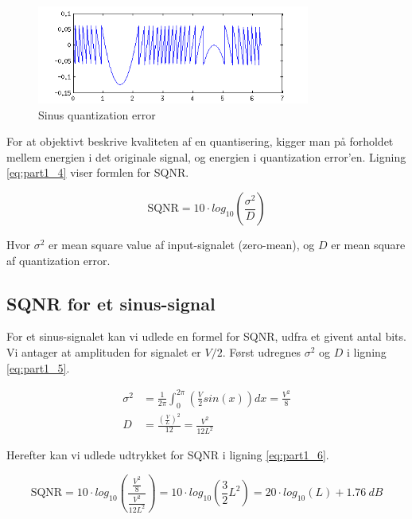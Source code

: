 \begin{figure}[!ht]
 	\centering
 	\includegraphics[width=0.8\textwidth]{resources/part1_sine_quant_error}
 	\caption{Sinus quantization error}
 	\label{fig:part1_3}
\end{figure}

For at objektivt beskrive kvaliteten af en quantisering, kigger man på forholdet mellem energien i det originale signal, og energien i quantization error'en. Ligning \ref{eq:part1_4} viser formlen for SQNR.

\begin{equation}\label{eq:part1_4}
	\text{SQNR} = 10 \cdot log_{10} \left( \frac{\sigma^2}{D} \right)
\end{equation}

Hvor $\sigma^2$ er mean square value af input-signalet (zero-mean), og $D$ er mean square af quantization error.

\subsection{SQNR for et sinus-signal}

For et sinus-signalet kan vi udlede en formel for SQNR, udfra et givent antal bits. Vi antager at amplituden for signalet er $V/2$. Først udregnes $\sigma^2$ og $D$ i ligning \ref{eq:part1_5}.

\begin{equation}\label{eq:part1_5}
	\begin{aligned}
	\sigma^2 &= \frac{1}{2\pi} \int_0^{2\pi} \left( \frac{V}{2} sin(x) \right) dx = \frac{V^2}{8} \\
	D &= \frac{\left( \frac{V}{L} \right)^2}{12} = \frac{V^2}{12 L^2}
	\end{aligned}
\end{equation}

Herefter kan vi udlede udtrykket for SQNR i ligning \ref{eq:part1_6}.

\begin{equation}\label{eq:part1_6}
	\text{SQNR} = 10 \cdot log_{10} \left( \frac{\frac{V^2}{8}}{\frac{V^2}{12 L^2}} \right) = 10 \cdot log_{10} \left( \frac{3}{2} L^2 \right) = 20 \cdot log_{10} (L) + 1.76\ dB
\end{equation}

